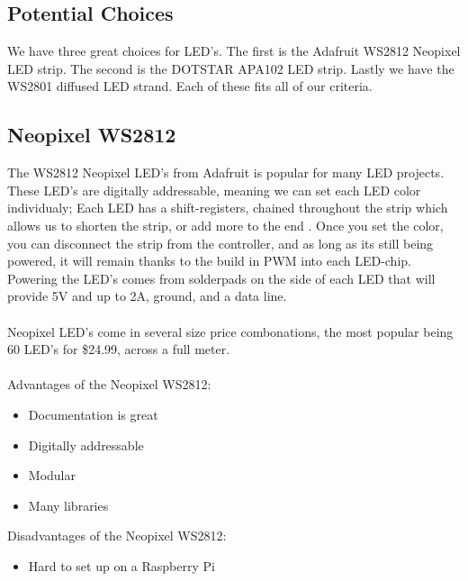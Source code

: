 \documentclass[onecolumn, draftclsnofoot,10pt, compsoc]{IEEEtran}
\begin{document}
		\subsection{Potential Choices}
		We have three great choices for LED's. The first is the Adafruit
		WS2812 Neopixel LED strip. The second is the DOTSTAR APA102 LED strip.
		Lastly we have the WS2801 diffused LED strand. Each of these fits all of
		our criteria.
		\subsection{Neopixel WS2812}
		The WS2812 Neopixel LED's from Adafruit is popular for many LED projects.
		These LED's are digitally addressable, meaning we can set each LED color
		individualy; Each LED has a shift-registers, chained throughout the strip
		which allows us to shorten the strip, or add more to the end
		\cite[Pg 2]{neo}. Once you set the color, you can disconnect the strip from
		the controller, and as long as its still being powered, it will remain
		thanks to the build in PWM into each LED-chip. Powering the LED's comes
		from solderpads on the side of each LED that will provide 5V and up to 2A,
		ground, and a data line.
		\\\\
		Neopixel LED's come in several size price combonations, the most popular
		being 60 LED's for \$24.99, across a full meter.
		\\\\
		Advantages of the Neopixel WS2812:
		\begin{itemize}
			\item Documentation is great
			\item Digitally addressable
			\item Modular
			\item Many libraries
		\end{itemize}
		Disadvantages of the Neopixel WS2812:
		\begin{itemize}
			\item Hard to set up on a Raspberry Pi
		\end{itemize}
\end{document}
